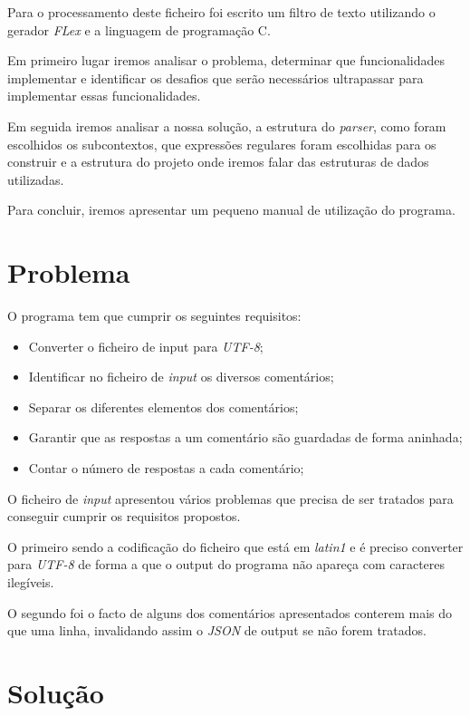 \documentclass[a4paper]{report}
\begin{document}
Para o processamento deste ficheiro foi escrito um filtro de texto utilizando 
o gerador \textit{FLex} e a linguagem de programação C.

Em primeiro lugar iremos analisar o problema, determinar que funcionalidades 
implementar e identificar os desafios que serão necessários ultrapassar
para implementar essas funcionalidades.

Em seguida iremos analisar a nossa solução, a estrutura do \textit{parser},
como foram escolhidos os subcontextos, que expressões regulares foram
escolhidas para os construir e a estrutura do projeto onde iremos falar
das estruturas de dados utilizadas.

Para concluir, iremos apresentar um pequeno manual de utilização do programa.

\chapter{Problema}

O programa tem que cumprir os seguintes requisitos:
\begin{itemize}
    \item Converter o ficheiro de input para \textit{UTF-8};
    \item Identificar no ficheiro de \textit{input} os diversos comentários;
    \item Separar os diferentes elementos dos comentários;
    \item Garantir que as respostas a um comentário são guardadas de forma
        aninhada;
    \item Contar o número de respostas a cada comentário;
\end{itemize}

O ficheiro de \textit{input} apresentou vários problemas que precisa de ser
tratados para conseguir cumprir os requisitos propostos.

O primeiro sendo a codificação do ficheiro que está em \textit{latin1} e é
preciso converter para \textit{UTF-8} de forma a que o output do programa não
apareça com caracteres ilegíveis.

O segundo foi o facto de alguns dos comentários apresentados conterem mais do que
uma linha, invalidando assim o \textit{JSON} de output se não forem tratados.

\chapter{Solução}
\end{document}
